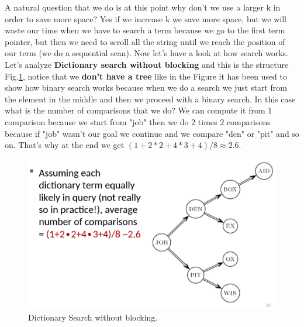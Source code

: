 A natural question that we do is at this point why don't we use a larger k in order to save more space? Yes if we increase k we save more space, but we will waste our time when we have to search a term because we go to the first term pointer, but then we need to scroll all the string until we reach the position of our term (we do a sequential scan).\newline
Now let's have a look at how search works. Let's analyze \textbf{Dictionary search without blocking} and this is the structure Fig.\ref{fig:dictionarysearchwithout}, notice that we \textbf{don't have a tree} like in the Figure it has been used to show how binary search works because when we do a search we just start from the element in the middle and then we proceed with a binary search. In this case what is the number of comparisons that we do? We can compute it from 1 comparison because we start from "job" then we do 2 times 2 comparisons because if "job" wasn't our goal we continue and we compare "den" or "pit" and so on. That's why at the end we get $(1+2*2+4*3+4)/8 \approx 2.6$.\newline
\begin{figure}
    \centering
    \includegraphics[width=0.75\linewidth]{images/dictionarysearchwithout.png}
    \caption{Dictionary Search without blocking.}
    \label{fig:dictionarysearchwithout}
\end{figure}


